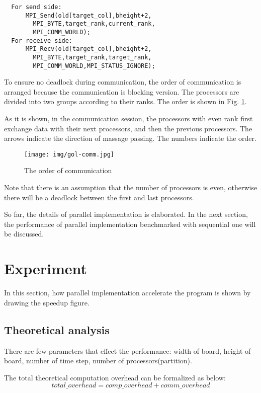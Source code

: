 \documentclass[sigchi]{acmart}
\begin{document}
\begin{lstlisting}
  For send side:
      MPI_Send(old[target_col],bheight+2,
        MPI_BYTE,target_rank,current_rank,
        MPI_COMM_WORLD);
  For receive side:
      MPI_Recv(old[target_col],bheight+2,
        MPI_BYTE,target_rank,target_rank,
        MPI_COMM_WORLD,MPI_STATUS_IGNORE);
\end{lstlisting}

To ensure no deadlock during communication, the order of communication is arranged because the communication is blocking version. 
The processors are divided into two groups according to their ranks. The order is shown in Fig. \ref{fig:comm_order}.

As it is shown, in the communication session, the processors with even rank first exchange data with their next processors, and then the previous processors.
The arrows indicate the direction of massage passing. The numbers indicate the order.

\begin{figure}[h]

  \texttt{[image: img/gol-comm.jpg]}
  \centering
  \caption{The order of communication}
  \label{fig:comm_order}
\end{figure}

Note that there is an assumption that the number of processors is even, otherwise there will be a deadlock between the first and last processors.

So far, the details of parallel implementation is elaborated. In the next section, the performance of parallel implementation benchmarked with sequential one will be discussed.

\section{Experiment}

In this section, how parallel implementation accelerate the program is shown by drawing the speedup figure.

\subsection{Theoretical analysis}
There are few parameters that effect the performance: width of board, height of board, number of time step, number of processors(partition).

The total theoretical computation overhead can be formalized as below:
\begin{equation}
  total\_overhead=comp\_overhead + comm\_overhead
  \label{eq:total}
\end{equation}
\end{document}
